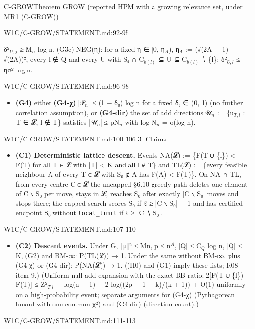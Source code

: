 \begin{card}{C-GROW}{Theorem GROW (reported HPM with a growing relevance set, under MR1 (C-GROW))}
\begin{stmt}{W1C/C-GROW/STATEMENT.md:92-95}
\begin{itemize}
δ²$_{U,j}$ ≥ M$_{n}$ log n. (G3c) NEG(η): for a fixed η ∈ [0, η$_{A}$), η$_{A}$ := (√(2A + 1) − √(2A))², every l ∉ Q and every
U with S₀ ∩ C$_{b(l)}$ ⊆ U ⊆ C$_{b(l)}$ ∖ \{l\}: δ²$_{U,l}$ ≤ ησ² log n.
\end{itemize}
\end{stmt}
\begin{stmt}{W1C/C-GROW/STATEMENT.md:96-98}
\begin{itemize}
\item \textbf{(G4)} either \textbf{(G4-χ)} |𝒫$_{n}$| ≤ (1 − δ₀) log n for a fixed δ₀ ∈ (0, 1) (no further correlation assumption), or
\textbf{(G4-dir)} the set of add directions 𝒰$_{n}$ := \{u$_{T,l}$ : T ∈ 𝓛, l ∉ T\} satisfies |𝒰$_{n}$| ≤ pN$_{n}$ with
log N$_{n}$ = o(log n).
\end{itemize}
\end{stmt}
\begin{stmt}{W1C/C-GROW/STATEMENT.md:100-106}
3. Claims
\begin{itemize}
\item \textbf{(C1) Deterministic lattice descent.} Events NA(𝓛) := \{F(T ∪ \{l\}) < F(T) for all T ∈ 𝓛 with |T| < K and all
l ∉ T\} and TL(𝓛) := \{every feasible neighbour A of every T ∈ 𝓛 with S₀ ⊄ A has F(A) < F(T)\}. On NA ∩ TL, from
every centre C ∈ 𝓛 the uncapped §6.10 greedy path deletes one element of C ∖ S₀ per move, stays in 𝓛, reaches S₀
after exactly |C ∖ S₀| moves and stops there; the capped search scores S₀ if ℓ ≥ |C ∖ S₀| − 1 and has certified
endpoint S₀ without \texttt{local\_limit} if ℓ ≥ |C ∖ S₀|.
\end{itemize}
\end{stmt}
\begin{stmt}{W1C/C-GROW/STATEMENT.md:107-110}
\begin{itemize}
\item \textbf{(C2) Descent events.} Under G, ‖μ‖² ≤ Mn, p ≤ n$^{A}$, |Q| ≤ C$_{Q}$ log n, |Q| ≤ K, (G2) and BM-∞: P(TL(𝓛)) → 1. Under
the same without BM-∞, plus (G4-χ) or (G4-dir): P(NA(𝓛)) → 1. ((H0) and (G1) imply these lists; R08 item 9.) (Uniform null-add expansion with the exact BB ratio: 2[F(T ∪ \{l\}) − F(T)] ≤ Z²$_{T,l}$ − log(n + 1)
− 2 log((2p − 1 − k)/(k + 1)) + O(1) uniformly on a high-probability event; separate arguments for (G4-χ)
(Pythagorean bound with one common χ²) and (G4-dir) (direction count).)
\end{itemize}
\end{stmt}
\begin{stmt}{W1C/C-GROW/STATEMENT.md:111-113}

\end{stmt}
\end{card}
